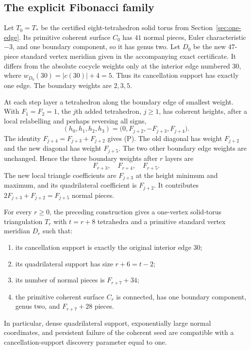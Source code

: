 \subsection{The explicit Fibonacci family}

Let $T_0=T_*$ be the certified eight-tetrahedron solid torus from
Section~\ref{sec:one-edge}. Its primitive coherent surface
$C_0$ has $41$ normal pieces, Euler characteristic $-3$, and one boundary
component, so it has genus two.  Let $D_0$ be the new $47$-piece standard
vertex meridian given in the accompanying exact certificate.  It differs
from the absolute cocycle weights only at the interior edge numbered
$30$, where $w_{D_0}(30)=|c(30)|+4=5$.  Thus its cancellation support
has exactly one edge.  The boundary weights are $2,3,5$.

At each step layer a tetrahedron along the boundary edge of smallest
weight.  With $F_1=F_2=1$, the $j$th added tetrahedron, $j\geq1$, has
coherent heights, after a local relabelling and perhaps reversing all
signs,
\[
 (h_0,h_1,h_2,h_3)
 =\bigl(0,F_{j+2},-F_{j+3},F_{j+4}\bigr).
\]
The identity $F_{j+4}=F_{j+3}+F_{j+2}$ gives (P).  The old diagonal
has weight $F_{j+2}$ and the new diagonal has weight $F_{j+5}$.
The two other boundary edge weights are unchanged.  Hence the three
boundary weights after $r$ layers are
\[
 F_{r+3},\quad F_{r+4},\quad F_{r+5}.
\]
The new local triangle coefficients are $F_{j+3}$ at the height
minimum and maximum, and its quadrilateral coefficient is $F_{j+2}$.
It contributes $2F_{j+3}+F_{j+2}=F_{j+5}$ normal pieces.

\begin{theorem}
\label{thm:dense-family}
For every $r\geq0$, the preceding construction gives a one-vertex
solid-torus triangulation $T_r$ with $t=r+8$ tetrahedra and a primitive
standard vertex meridian $D_r$ such that:
\begin{enumerate}
\item its cancellation support is exactly the original interior edge $30$;
\item its quadrilateral support has size $r+6=t-2$;
\item its number of normal pieces is $F_{r+7}+34$;
\item the primitive coherent surface $C_r$ is connected, has one boundary
component, genus two, and $F_{r+7}+28$ pieces.
\end{enumerate}
In particular, dense quadrilateral support, exponentially large normal
coordinates, and persistent failure of the coherent seed are compatible
with a cancellation-support discovery parameter equal to one.
\end{theorem}

